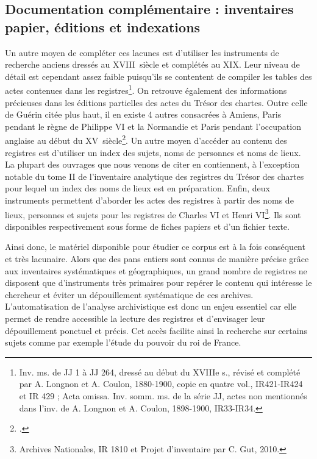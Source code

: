 \documentclass[a4paper,12pt,twoside]{book}
\begin{document}
	\subsection{Documentation complémentaire : inventaires papier, éditions et indexations}
	
	Un autre moyen de compléter ces lacunes est d'utiliser les instruments de recherche anciens dressés au XVIII\ieme\ siècle et complétés au XIX\ieme. Leur niveau de détail est cependant assez faible puisqu'ils se contentent de compiler les tables des actes contenues dans les registres\footnote{Inv. ms. de JJ 1 à JJ 264, dressé au début du XVIIIe s., révisé et complété par A. Longnon et A. Coulon, 1880-1900, copie en quatre vol., IR421-IR424 et IR 429 ; Acta omissa. Inv. somm. ms. de la série JJ, actes non mentionnés dans	l’inv. de A. Longnon et A. Coulon, 1898-1900, IR33-IR34.}. On retrouve également des informations précieuses dans les éditions partielles des actes du Trésor des chartes. Outre celle de Guérin citée plus haut, il en existe 4 autres consacrées à Amiens, Paris pendant le règne de Philippe VI et la Normandie et Paris pendant l'occupation anglaise au début du XV\ieme\ siècle\footcite{guerin_actes_1881, viard_documents_1899, longnon_paris_1878, le_cacheux_actes_1907, maugis_documents_1908}. Un autre moyen d'accéder au contenu des registres est d'utiliser un index des sujets, noms de personnes et noms de lieux. La plupart des ouvrages que nous venons de citer en contiennent, à l'exception notable du tome II de l'inventaire analytique des registres du Trésor des chartes pour lequel un index des noms de lieux est en préparation. Enfin, deux instruments permettent d'aborder les actes des registres à partir des noms de lieux, personnes et sujets pour les registres de Charles VI et Henri VI\footnote{Archives Nationales, IR 1810 et Projet d'inventaire par C. Gut, 2010.}. Ils sont disponibles respectivement sous forme de fiches papiers et d'un fichier texte. 
	
	Ainsi donc, le matériel disponible pour étudier ce corpus est à la fois conséquent et très lacunaire. Alors que des pans entiers sont connus de manière précise grâce aux inventaires systématiques et géographiques, un grand nombre de registres ne disposent que d'instruments très primaires pour repérer le contenu qui intéresse le chercheur et éviter un dépouillement systématique de ces archives. L'automatisation de l'analyse archivistique est donc un enjeu essentiel car elle permet de rendre accessible la lecture des registres et d'envisager leur dépouillement ponctuel et précis. Cet accès facilite ainsi la recherche sur certains sujets comme par exemple l'étude du pouvoir du roi de France.  
\end{document}
